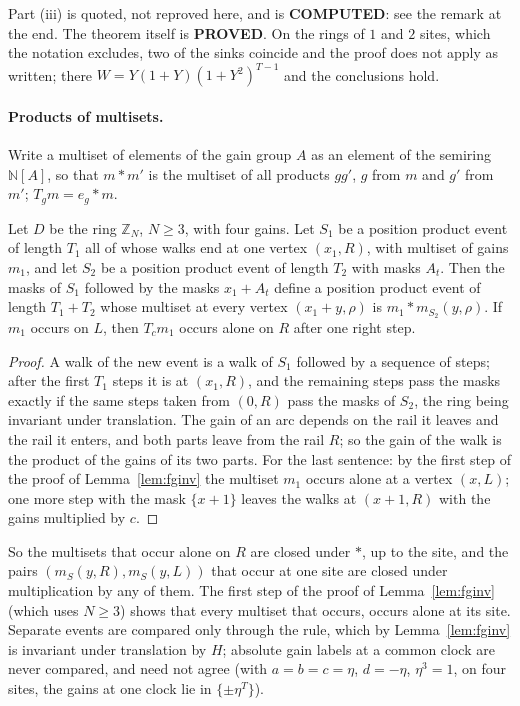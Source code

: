 Part (iii) is quoted, not reproved here, and is \textbf{COMPUTED}: see the remark at the end. The theorem itself is \textbf{PROVED}. On the rings of $1$ and $2$ sites, which the notation excludes, two of the sinks coincide and the proof does not apply as written; there $W=Y(1+Y)(1+Y^{2})^{T-1}$ and the conclusions hold.

\paragraph{Products of multisets.} Write a multiset of elements of the gain group $A$ as an element of the semiring $\mathbb{N}[A]$, so that $m*m'$ is the multiset of all products $gg'$, $g$ from $m$ and $g'$ from $m'$; $T_g m=e_g*m$.

\begin{lemma}\label{lem:twist}
Let $D$ be the ring $\mathbb{Z}_N$, $N\ge3$, with four gains. Let $S_1$ be a position product event of length $T_1$ all of whose walks end at one vertex $(x_1,R)$, with multiset of gains $m_1$, and let $S_2$ be a position product event of length $T_2$ with masks $A_t$. Then the masks of $S_1$ followed by the masks $x_1+A_t$ define a position product event of length $T_1+T_2$ whose multiset at every vertex $(x_1+y,\rho)$ is $m_1*m_{S_2}(y,\rho)$. If $m_1$ occurs on $L$, then $T_cm_1$ occurs alone on $R$ after one right step.
\end{lemma}
\begin{proof}
A walk of the new event is a walk of $S_1$ followed by a sequence of steps; after the first $T_1$ steps it is at $(x_1,R)$, and the remaining steps pass the masks exactly if the same steps taken from $(0,R)$ pass the masks of $S_2$, the ring being invariant under translation. The gain of an arc depends on the rail it leaves and the rail it enters, and both parts leave from the rail $R$; so the gain of the walk is the product of the gains of its two parts. For the last sentence: by the first step of the proof of Lemma~\ref{lem:fginv} the multiset $m_1$ occurs alone at a vertex $(x,L)$; one more step with the mask $\{x+1\}$ leaves the walks at $(x+1,R)$ with the gains multiplied by $c$.
\end{proof}

So the multisets that occur alone on $R$ are closed under $*$, up to the site, and the pairs $(m_S(y,R),m_S(y,L))$ that occur at one site are closed under multiplication by any of them. The first step of the proof of Lemma~\ref{lem:fginv} (which uses $N\ge3$) shows that every multiset that occurs, occurs alone at its site. Separate events are compared only through the rule, which by Lemma~\ref{lem:fginv} is invariant under translation by $H$; absolute gain labels at a common clock are never compared, and need not agree (with $a=b=c=\eta$, $d=-\eta$, $\eta^3=1$, on four sites, the gains at one clock lie in $\{\pm\eta^T\}$).

